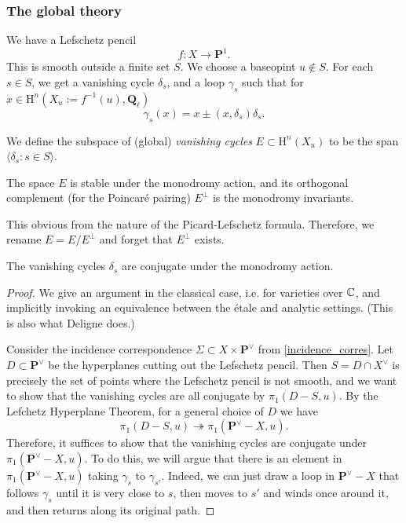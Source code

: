 \documentclass[letterpaper,11pt]{article}
\newcommand{\Q}{\mathbf{Q}}
\newcommand{\PS}{\mathbf{P}}
\newcommand{\mrm}[1]{\mathrm{#1}}
\begin{document}
\subsubsection{The global theory}
We have a Lefschetz pencil 
\[
f \colon X \rightarrow \PS^1.
\]
This is smooth outside a finite set $S$. We choose a baseopint $u \notin S$. For each $s \in S$, we get a vanishing cycle $\delta_s$, and a loop $\gamma_s$ such that for $x \in \mrm{H}^n(X_u := f^{-1}(u), \Q_{\ell})$ 
\[
\gamma_s(x) = x \pm (x, \delta_s) \delta_s.
\]

\begin{defn}
We define the subspace of (global) \emph{vanishing cycles} $E \subset \mrm{H}^n(X_u)$ to be the span $\langle \delta_s \colon s \in S\rangle$. 
\end{defn}


\begin{prop}
The space $E$ is stable under the monodromy action, and its orthogonal complement (for the Poincar\'{e} pairing) $E^{\perp}$ is the monodromy invariants. 
\end{prop}

This obvious from the nature of the Picard-Lefschetz formula. Therefore, we rename $E = E/E^{\perp}$  and forget that $E^{\perp}$ exists. 

\begin{thm}
The vanishing cycles $\delta_s$ are conjugate under the monodromy action. 
\end{thm}

\begin{proof}
We give an argument in the classical case, i.e. for varieties over $\mathbb{C}$, and implicitly invoking an equivalence between the \'{e}tale and analytic settings. (This is also what Deligne does.) 

Consider the incidence correspondence $\Sigma \subset X \times \PS^{\vee}$ from \eqref{incidence_corres}. Let $D \subset \PS^{\vee}$ be the hyperplanes cutting out the Lefschetz pencil. Then $S = D \cap X^{\vee}$ is precisely the set of points where the Lefschetz pencil is not smooth, and we want to show that the vanishing cycles are all conjugate by $\pi_1(D-S, u)$. By the Lefchetz Hyperplane Theorem, for a general choice of $D$ we have 
\[
\pi_1(D-S, u) \twoheadrightarrow \pi_1(\PS^{\vee}-X, u).
\]
Therefore, it suffices to show that the vanishing cycles are conjugate under $\pi_1(\PS^{\vee}-X, u)$. To do this, we will argue that there is an element in $\pi_1(\PS^{\vee}-X, u)$ taking $\gamma_s$ to $\gamma_{s'}$. Indeed, we can just draw a loop in $\PS^{\vee}-X$ that follows $\gamma_s$ until it is very close to $s$, then moves to $s'$ and winds once around it, and then returns along its original path. 
\end{proof}
\end{document}
